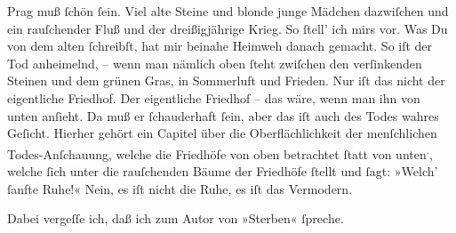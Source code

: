 \pstart
           Prag muß{ }ſchön{ }ſein. Viel alte Steine und blonde
               junge Mädchen dazwiſchen {\pb}und ein rauſchender Fluß und der dreißigjährige
               Krieg. So{ }ſtell’ ich mirs vor. Was Du von dem alten \label{K_L02739-2v}\label{K_L02739-2}{ }ſchreibſt, hat
               mir beinahe Heimweh danach gemacht. So iſt der Tod anheimelnd, – wenn man nämlich
               oben{ }ſteht zwiſchen den verſinkenden Steinen und dem grünen Gras, in Sommerluft und
               Frieden. Nur iſt das nicht der eigentliche Friedhof. Der eigentliche {\pb}Friedhof – das wäre, wenn man ihn von unten anſieht.
               Da muß er{ }ſchauderhaft{ }ſein, aber das  iſt auch des Todes wahres Geſicht. Hierher gehört ein Capitel über die
               Oberflächlichkeit der menſchlichen Todes-Anſchauung, welche die Friedhöfe von oben
               betrachtet{ }ſtatt von unten\substVorne{}\textsuperscript{.}\substDazwischen{},\substHinten{} welche{ }ſich unter die  rauſchenden Bäume der Friedhöfe{ }ſtellt und{ }ſagt: {\pb}»Welch’{ }ſanfte Ruhe!« Nein, es iſt nicht die Ruhe,
               es iſt das Vermodern.\pend
           
\pstart
           Dabei vergeſſe ich, daß ich zum Autor von »Sterben«{ }ſpreche.\pend
           
